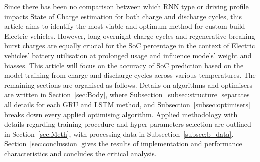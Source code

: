 Since there has been no comparison between which RNN type or driving profile impacts State of Charge estimation for both charge and discharge cycles, this article aims to identify the most viable and optimum method for custom build Electric vehicles.
However, long overnight charge cycles and regenerative breaking burst charges are equally crucial for the SoC percentage in the context of Electric vehicles' battery utilisation at prolonged usage and influence models' weight and biasses.
This article will focus on the accuracy of SoC prediction based on the model training from charge and discharge cycles across various temperatures.
%
%
The remaining sections are organised as follows.
 {
    Details on algorithms and optimisers are written in Section~\ref{sec:Body}, where Subsection~\ref{subsec:structure} separates all details for each GRU and LSTM method, and Subsection~\ref{subsec:optimisers} breaks down every applied optimising algorithm.
    Applied methodology with details regarding training procedure and hyper-parameters selection are outlined in Section~\ref{sec:Meth}, with processing data in Subsection~\ref{subsec:b_data}.
    Section~\ref{sec:conclussion} gives the results of implementation and performance characteristics and concludes the critical analysis.
}
